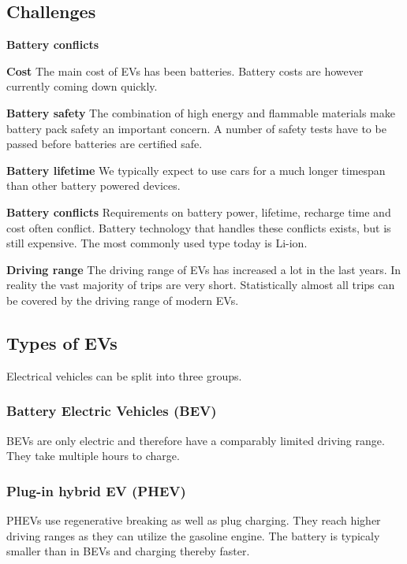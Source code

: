 \subsection{Challenges}

\begin{labeling}{\textbf{Battery conflicts}}
    \item [\textbf{Cost}]
    The main cost of EVs has been batteries.
    Battery costs are however currently coming down quickly.
    \item [\textbf{Battery safety}]
    The combination of high energy and flammable materials make battery pack safety an important concern.
    A number of safety tests have to be passed before batteries are certified safe.
    \item [\textbf{Battery lifetime}]
    We typically expect to use cars for a much longer timespan than other battery powered devices.
    \item [\textbf{Battery conflicts}]
    Requirements on battery power, lifetime, recharge time and cost often conflict.
    Battery technology that handles these conflicts exists, but is still expensive.
    The most commonly used type today is Li-ion.
    \item [\textbf{Driving range}]
    The driving range of EVs has increased a lot in the last years.
    In reality the vast majority of trips are very short.
    Statistically almost all trips can be covered by the driving range of modern EVs.
\end{labeling}

\subsection{Types of EVs}
Electrical vehicles can be split into three groups.

\subsubsection{Battery Electric Vehicles (BEV)}
BEVs are only electric and therefore have a comparably limited driving range. They take multiple hours to charge.

\subsubsection{Plug-in hybrid EV (PHEV)}
PHEVs use regenerative breaking as well as plug charging.
They reach higher driving ranges as they can utilize the gasoline engine.
The battery is typicaly smaller than in BEVs and charging thereby faster.

